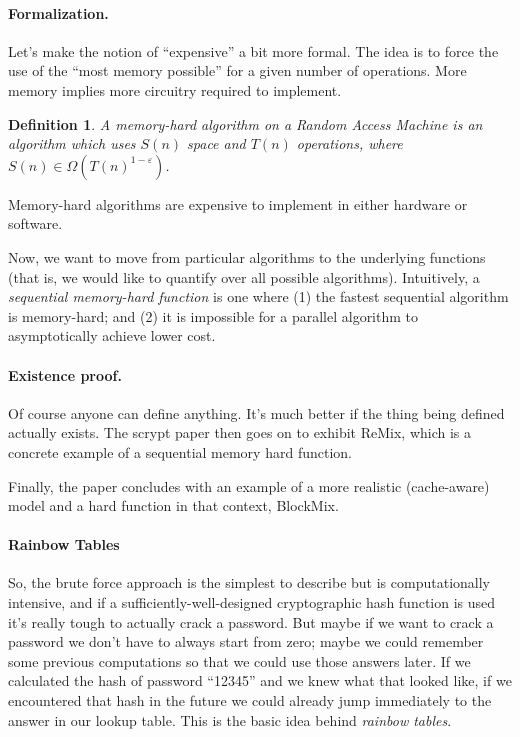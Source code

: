 \documentclass[a4paper]{report}
\begin{document}
\newtheorem{defn}{Definition}

\paragraph{Formalization.} Let's make the notion of ``expensive'' a bit more formal.
The idea is to force the use of the ``most memory possible'' for a given number of
operations. More memory implies more circuitry required to implement.

    \begin{defn}
      A \emph{memory-hard} algorithm on a Random Access Machine is an
      algorithm which uses $S(n)$ space and $T(n)$ operations, where
      $S(n) \in \Omega(T(n)^{1-\varepsilon})$.
    \end{defn}

Memory-hard algorithms are expensive to implement in either hardware or software.

Now, we want to move from particular algorithms to the underlying
functions (that is, we would like to quantify over all possible
algorithms). Intuitively, a \emph{sequential memory-hard function} is
one where (1) the fastest sequential algorithm is memory-hard; and (2)
it is impossible for a parallel algorithm to asymptotically achieve
lower cost.

\paragraph{Existence proof.} Of course anyone can define anything.
It's much better if the thing being defined actually exists. The
scrypt paper then goes on to exhibit ReMix, which is a concrete
example of a sequential memory hard function.

Finally, the paper concludes with an example of a more realistic
(cache-aware) model and a hard function in that context, BlockMix.

\paragraph{Rainbow Tables} So, the brute force approach is the simplest to describe but is computationally intensive, and if a sufficiently-well-designed cryptographic hash function is used it's really tough to actually crack a password. But maybe if we want to crack a password we don't have to always start from zero; maybe we could remember some previous computations so that we could use those answers later. If we calculated the hash of password ``12345'' and we knew what that looked like, if we encountered that hash in the future we could already jump immediately to the answer in our lookup table. This is the basic idea behind \textit{rainbow tables}.
\end{document}
